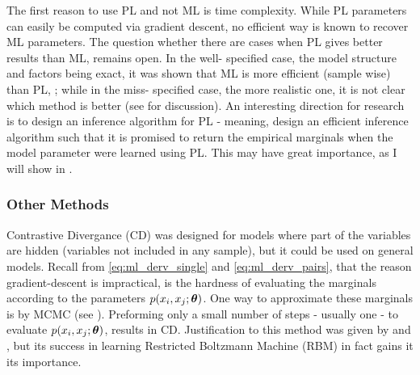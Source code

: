 The first reason to use PL and not ML is time complexity.
While PL parameters can easily be computed via gradient descent,
no efficient way is known to recover ML parameters.
The question whether there are cases when PL gives better results than ML, remains open.
In the well- specified case, the model structure and factors being exact, it was shown that ML is more efficient (sample wise) than PL, \cite{liang2008asymptotic};
while in the miss- specified case, the more realistic one, it is not clear which method is better (see \cite{varin2011overview} for discussion).
An interesting direction for research is to design an inference algorithm for PL - 
meaning, design an efficient inference algorithm such that it is promised to return the empirical marginals when the model parameter were learned using PL.
This may have great importance, as I will show in .

\subsubsection{Other Methods}
Contrastive Divergance (CD) \cite{hinton2002training} was designed for models where part of the variables are hidden (variables not included in any sample), but it could be used on general models.
Recall from \eqref{eq:ml_derv_single} and \eqref{eq:ml_derv_pairs}, that the reason gradient-descent is impractical,  is the hardness of evaluating the marginals according to the parameters $p(x_i,x_j;\boldsymbol{\theta})$. 
One way to approximate these marginals is by MCMC (see ).
Preforming only a small number of steps - usually one - to evaluate $p(x_i,x_j;\boldsymbol{\theta})$, results in CD.
Justification to this method was given by \cite{bengio2009justifying} and \cite{carreira2005contrastive}, but its success in learning Restricted Boltzmann Machine (RBM) in fact gains it its importance.


